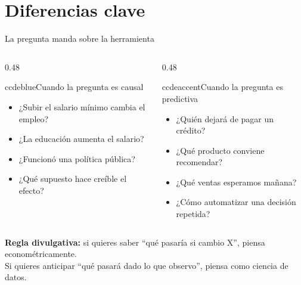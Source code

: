 \documentclass[aspectratio=169,11pt,table]{beamer}
\begin{document}
\section{Diferencias clave}

\begin{frame}{La pregunta manda sobre la herramienta}
\begin{columns}[T,onlytextwidth]
\begin{column}{0.48\textwidth}
\begin{contrastbox}{ccdeblue}{Cuando la pregunta es causal}
\small
\begin{itemize}
  \item ¿Subir el salario mínimo cambia el empleo?
  \item ¿La educación aumenta el salario?
  \item ¿Funcionó una política pública?
  \item ¿Qué supuesto hace creíble el efecto?
\end{itemize}
\end{contrastbox}
\end{column}
\begin{column}{0.48\textwidth}
\begin{contrastbox}{ccdeaccent}{Cuando la pregunta es predictiva}
\small
\begin{itemize}
  \item ¿Quién dejará de pagar un crédito?
  \item ¿Qué producto conviene recomendar?
  \item ¿Qué ventas esperamos mañana?
  \item ¿Cómo automatizar una decisión repetida?
\end{itemize}
\end{contrastbox}
\end{column}
\end{columns}

\vspace{0.35cm}
\begin{keybox}
\centering
\textbf{Regla divulgativa:} si quieres saber ``qué pasaría si cambio X'', piensa econométricamente.\\
Si quieres anticipar ``qué pasará dado lo que observo'', piensa como ciencia de datos.
\end{keybox}

\end{frame}
\end{document}
